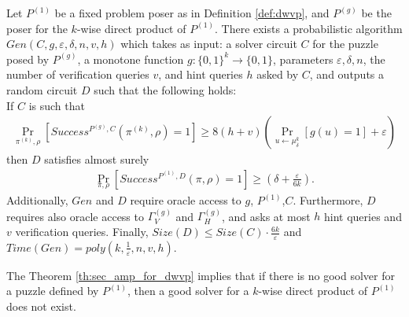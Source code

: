 \begin{theorem}
\label{th:sec_amp_for_dwvp}
Let $P^{(1)}$ be a fixed problem poser as in Definition \ref{def:dwvp}, and $P^{(g)}$ be the poser for the $k$-wise direct product of $P^{(1)}$.
There exists a probabilistic algorithm $Gen(C, g, \varepsilon, \delta, n, v, h)$ which takes as input: a solver circuit $C$ for the puzzle posed by $P^{(g)}$,
a monotone function $g:\{0,1\}^k \rightarrow \{0,1\}$, parameters $\varepsilon, \delta,n$,
the number of verification queries $v$, and hint queries $h$ asked by $C$, and outputs a random circuit $D$
such that the following holds: \\
If $C$ is such that \\
  \begin{align*}
    \underset{\pi^{(k)}, \rho}{\Pr}[Success^{P^{(g)}, C}(\pi^{(k)}, \rho) = 1] \geq 8(h+v)\left(\underset{u \leftarrow \mu_\delta^k}{\Pr}[g(u) = 1] + \varepsilon\right)
  \end{align*}
then $D$ satisfies almost surely
  \begin{align*}
    \underset{\pi, \rho}{\Pr}[Success^{P^{(1)},D}(\pi, \rho) = 1] \geq (\delta + \frac{\varepsilon}{6k}).
  \end{align*}
Additionally, $Gen$ and $D$ require oracle access to $g$, $P^{(1)}$,$C$.
Furthermore, $D$ requires also oracle access to $\Gamma_V^{(g)}$ and $\Gamma_H^{(g)}$,
and asks at most $h$ hint queries and $v$ verification queries.
Finally, $Size(D) \leq Size(C) \cdot \frac{6k}{\varepsilon}$ and $Time(Gen) = poly(k, \frac{1}{\varepsilon}, n, v, h)$.
\end{theorem}
%
The Theorem \ref{th:sec_amp_for_dwvp} implies that if there is no good solver for a puzzle defined by $P^{(1)}$, then a good solver for
a $k$-wise direct product of $P^{(1)}$ does not exist.


